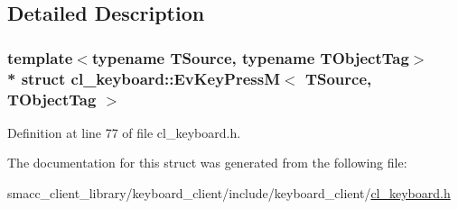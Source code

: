 \subsection{Detailed Description}
\subsubsection*{template$<$typename T\+Source, typename T\+Object\+Tag$>$\\*
struct cl\+\_\+keyboard\+::\+Ev\+Key\+Press\+M$<$ T\+Source, T\+Object\+Tag $>$}



Definition at line 77 of file cl\+\_\+keyboard.\+h.



The documentation for this struct was generated from the following file\+:\begin{DoxyCompactItemize}
\item 
smacc\+\_\+client\+\_\+library/keyboard\+\_\+client/include/keyboard\+\_\+client/\hyperlink{cl__keyboard_8h}{cl\+\_\+keyboard.\+h}\end{DoxyCompactItemize}
